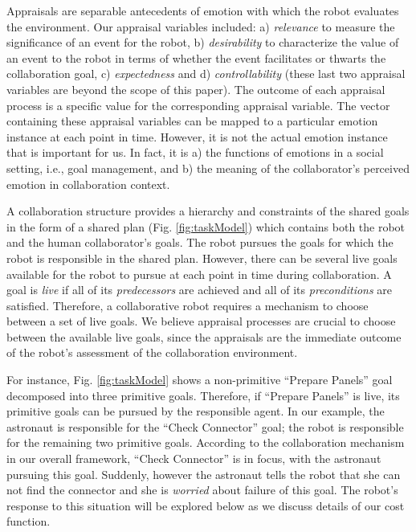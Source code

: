 Appraisals are separable antecedents of emotion with which the robot
evaluates the environment. Our appraisal variables included: a)
\textit{relevance} to measure the significance of an event for the robot, b)
\textit{desirability} to characterize the value of an event to the robot in
terms of whether the event facilitates or thwarts the collaboration goal, c)
\textit{expectedness} and d) \textit{controllability} (these last two appraisal
variables are beyond the scope of this paper). The outcome of each appraisal
process is a specific value for the corresponding appraisal variable. The vector
containing these appraisal variables can be mapped to a particular emotion
instance at each point in time. However, it is not the actual emotion instance
that is important for us. In fact, it is a) the functions of emotions in a
social setting, i.e., goal management, and b) the meaning of the collaborator's
perceived emotion in collaboration context.

A collaboration structure provides a hierarchy and constraints of the shared
goals in the form of a shared plan (Fig. \ref{fig:taskModel}) which contains
both the robot and the human collaborator's goals. The robot pursues the goals
for which the robot is responsible in the shared plan. However, there can be
several live goals available for the robot to pursue at each point in time
during collaboration. A goal is \textit{live} if all of its
\textit{predecessors} are achieved and all of its \textit{preconditions} are
satisfied. Therefore, a collaborative robot requires a mechanism to choose
between a set of live goals. We believe appraisal processes are crucial to
choose between the available live goals, since the appraisals are the immediate
outcome of the robot's assessment of the collaboration environment.

For instance, Fig. \ref{fig:taskModel} shows a non-primitive ``Prepare Panels''
goal decomposed into three primitive goals. Therefore, if ``Prepare Panels'' is
live, its primitive goals can be pursued by the responsible agent. In our
example, the astronaut is responsible for the ``Check Connector'' goal; the
robot is responsible for the remaining two primitive goals. According to the
collaboration mechanism in our overall framework, ``Check Connector'' is in
focus, with the astronaut pursuing this goal. Suddenly, however the astronaut
tells the robot that she can not find the connector and she is \textit{worried}
about failure of this goal. The robot's response to this situation will be
explored below as we discuss details of our cost function.

